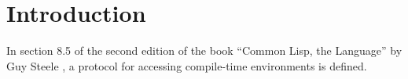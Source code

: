 \chapter{Introduction}
%

In section 8.5 of the second edition of the book ``Common Lisp, the
Language'' by Guy Steele \cite{Steele:1990:CLL:95411}, a protocol for
accessing compile-time environments is defined.
